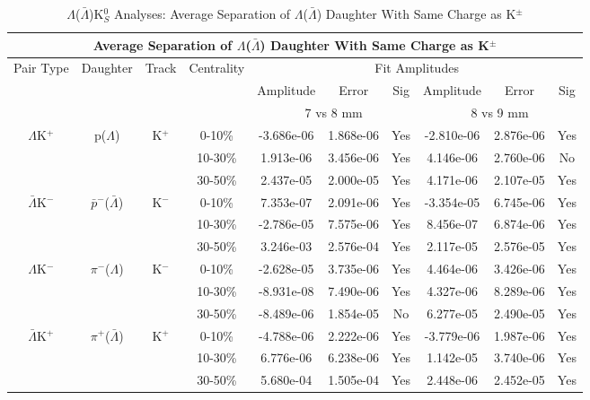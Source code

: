\documentclass[../AnalysisNoteJBuxton.tex]{subfiles}
\begin{document}



\begin{table}
 \centering
 \begin{tabular}{|c|c|c|c|c|c|c||c|c|c|}
  \multicolumn{10}{c}{Average Separation of $\Lambda$($\bar{\Lambda}$) Daughter With Same Charge as K$^{\pm}$} \\
  \hline
  \multirow{3}{*}{Pair Type} & \multirow{3}{*}{Daughter} & \multirow{3}{*}{Track} & \multirow{3}{*}{Centrality} & \multicolumn{6}{c|}{Fit Amplitudes} \\
  \cline{5-10}
   & & & & Amplitude & Error & Sig & Amplitude & Error & Sig \\  
  \cline{5-10}
   & & & & \multicolumn{3}{c||}{7 vs 8 mm} & \multicolumn{3}{c|}{8 vs 9 mm} \\  
  \hline
  \multirow{3}{*}{$\Lambda$K$^{+}$} & \multirow{3}{*}{p($\Lambda$)} & \multirow{3}{*}{K$^{+}$}
   &      0-10\% & -3.686e-06 & 1.868e-06 & Yes & -2.810e-06 & 2.876e-06 & Yes \\
   & & & 10-30\% & 1.913e-06 & 3.456e-06 & Yes & 4.146e-06 & 2.760e-06 & No \\
   & & & 30-50\% & 2.437e-05 & 2.000e-05 & Yes & 4.171e-06 & 2.107e-05 & Yes \\
  \hline
  \multirow{3}{*}{$\bar{\Lambda}$K$^{-}$} & \multirow{3}{*}{$\bar{p}^{-}$($\bar{\Lambda}$)} & \multirow{3}{*}{K$^{-}$}
   &      0-10\% & 7.353e-07 & 2.091e-06 & Yes & -3.354e-05 & 6.745e-06 & Yes \\
   & & & 10-30\% & -2.786e-05 & 7.575e-06 & Yes & 8.456e-07 & 6.874e-06 & Yes \\
   & & & 30-50\% & 3.246e-03 & 2.576e-04 & Yes & 2.117e-05 & 2.576e-05 & Yes \\
  \hline \hline
  \multirow{3}{*}{$\Lambda$K$^{-}$} & \multirow{3}{*}{$\pi^{-}$($\Lambda$)} & \multirow{3}{*}{K$^{-}$}
   &      0-10\% & -2.628e-05 & 3.735e-06 & Yes & 4.464e-06 & 3.426e-06 & Yes \\
   & & & 10-30\% & -8.931e-08 & 7.490e-06 & Yes & 4.327e-06 & 8.289e-06 & Yes \\
   & & & 30-50\% & -8.489e-06 & 1.854e-05 & No & 6.277e-05 & 2.490e-05 & Yes \\
  \hline
  \multirow{3}{*}{$\bar{\Lambda}$K$^{+}$} & \multirow{3}{*}{$\pi^{+}$($\bar{\Lambda}$)} & \multirow{3}{*}{K$^{+}$}
   &      0-10\% & -4.788e-06 & 2.222e-06 & Yes & -3.779e-06 & 1.987e-06 & Yes \\
   & & & 10-30\% & 6.776e-06 & 6.238e-06 & Yes & 1.142e-05 & 3.740e-06 & Yes \\
   & & & 30-50\% & 5.680e-04 & 1.505e-04 & Yes & 2.448e-06 & 2.452e-05 & Yes \\
  \hline
 \end{tabular}
 \caption{$\Lambda$($\bar{\Lambda}$)K$^{0}_{S}$ Analyses: Average Separation of $\Lambda$($\bar{\Lambda}$) Daughter With Same Charge as K$^{\pm}$}
 \label{tab:AvgSepLamKch}
\end{table}
\end{document}
